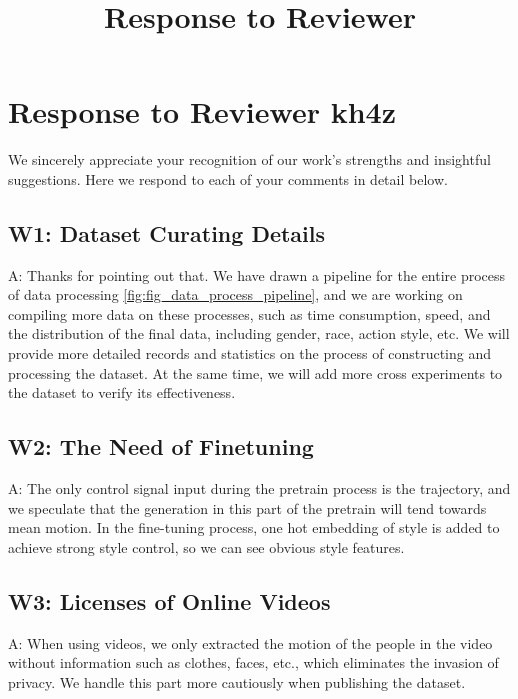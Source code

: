 \documentclass{article}
\title{Response to Reviewer}
\begin{document}
\maketitle

\section{Response to Reviewer kh4z}\label{response-to-reviewer-kh4z}

We sincerely appreciate your recognition of our work's strengths and insightful suggestions. Here we respond to each of your comments in detail below.



\subsection{W1: Dataset Curating Details}\label{w1-dataset-curating-details}
A: Thanks for pointing out that. We have drawn a pipeline for the entire process of data processing \ref{fig:fig_data_process_pipeline}, and we are working on compiling more data on these processes, such as time consumption, speed, and the distribution of the final data, including gender, race, action style, etc. We will provide more detailed records and statistics on the process of constructing and processing the dataset. At the same time, we will add more cross experiments to the dataset to verify its effectiveness. 

\subsection{W2: The Need of Finetuning}\label{w2-the-need-of-finetuning}

A: The only control signal input during the pretrain process is the trajectory, and we speculate that the generation in this part of the pretrain will tend towards mean motion. In the fine-tuning process, one hot embedding of style is added to achieve strong style control, so we can see obvious style features.

\subsection{W3: Licenses of Online Videos}\label{w3-licenses-of-online-videos}

A: When using videos, we only extracted the motion of the people in the video without information such as clothes, faces, etc., which eliminates the invasion of privacy. We handle this part more cautiously when publishing the dataset.
\end{document}
